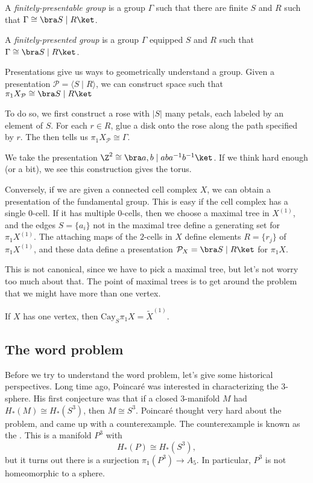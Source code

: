 \documentclass[a4paper]{article}
\newcommand\Cay{\mathrm{Cay}}
\begin{document}
\begin{defi}
  A \emph{finitely-presentable group} is a group $\Gamma$ such that there are finite $S$ and $R$ such that $\Gamma \cong \bra S \mid R\ket$.

  A \emph{finitely-presented group} is a group $\Gamma$ equipped $S$ and $R$ such that $\Gamma \cong \bra S \mid R \ket$.
\end{defi}

Presentations give us ways to geometrically understand a group. Given a presentation $\mathcal{P} = \langle S \mid R \rangle$, we can construct space  such that $\pi_1 X_\mathcal{P} \cong \bra S \mid R\ket$ 

To do so, we first construct a rose with $|S|$ many petals, each labeled by an element of $S$. For each $r \in R$, glue a disk onto the rose along the path specified by $r$. The  then tells us $\pi_1 X_{\mathcal{P}} \cong \Gamma$.

\begin{eg}
  We take the presentation $\Z^2 \cong \bra a, b \mid aba^{-1}b^{-1}\ket$. If we think hard enough (or a bit), we see this construction gives the torus.
\end{eg}

Conversely, if we are given a connected cell complex $X$, we can obtain a presentation of the fundamental group. This is easy if the cell complex has a single $0$-cell. If it has multiple $0$-cells, then we choose a maximal tree in $X^{(1)}$, and the edges $S = \{a_i\}$ not in the maximal tree define a generating set for $\pi_1 X^{(1)}$. The attaching maps of the $2$-cells in $X$ define elements $R = \{r_j\}$ of $\pi_1 X^{(1)}$, and these data define a presentation $\mathcal{P}_X = \bra S \mid R\ket$ for $\pi_1 X$.

This is not canonical, since we have to pick a maximal tree, but let's not worry too much about that. The point of maximal trees is to get around the problem that we might have more than one vertex.

\begin{ex}
  If $X$ has one vertex, then $\Cay_S \pi_1 X = \tilde{X}^{(1)}$.
\end{ex}

\subsection{The word problem}
Before we try to understand the word problem, let's give some historical perspectives. Long time ago, Poincar\'e was interested in characterizing the $3$-sphere. His first conjecture was that if a closed $3$-manifold $M$ had $H_*(M) \cong H_*(S^3)$, then $M \cong S^3$. Poincar\'e thought very hard about the problem, and came up with a counterexample. The counterexample is known as the . This is a manifold $P^3$ with
\[
  H_*(P) \cong H_*(S^3),
\]
but it turns out there is a surjection $\pi_1(P^3) \to A_5$. In particular, $P^3$ is not homeomorphic to a sphere.
\end{document}
